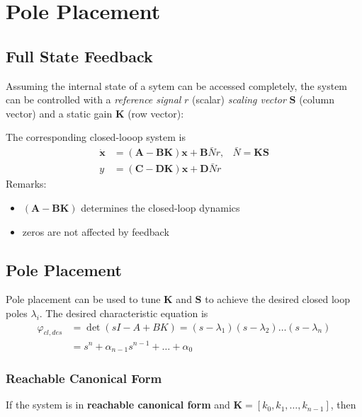 \section{Pole Placement}

\subsection{Full State Feedback}
Assuming the internal state of a sytem can be accessed completely, the system can be controlled
with a \textit{reference signal} $r$ (scalar) \textit{scaling vector} $\mathbf{S}$ (column vector) and a static gain $\mathbf{K}$ (row vector):
\begin{center}
    
\end{center}
The corresponding closed-looop system is
\noindent\begin{align*}
    \dot{\mathbf{x}} & =(\mathbf{A}-\mathbf{BK})\mathbf{x}+\mathbf{B}\bar{N}r, & \bar{N}=\mathbf{KS} \\
    y                & =(\mathbf{C}-\mathbf{DK})\mathbf{x} +\mathbf{D}\bar{N}r
\end{align*}
Remarks:
\begin{itemize}
    \item $(\mathbf{A}-\mathbf{BK})$ determines the closed-loop dynamics
    \item zeros are not affected by feedback
\end{itemize}

\subsection{Pole Placement}
Pole placement can be used to tune $\mathbf{K}$ and $\mathbf{S}$ to achieve the desired closed loop poles $\lambda_i$.
The desired characteristic equation is
\noindent\begin{align*}
    \varphi_{cl,des} & =\det{(sI-A+BK)}=(s-\lambda_1)(s-\lambda_2)\ldots(s-\lambda_n) \\
                     & =s^n+\alpha_{n-1}s^{n-1}+\ldots+\alpha_0
\end{align*}

\subsubsection{Reachable Canonical Form}
If the system is in \textbf{reachable canonical form} and $\mathbf{K} = \left[k_0,k_1,\ldots,k_{n-1}\right]$, then

